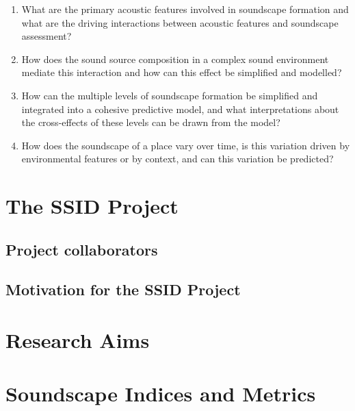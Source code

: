   \begin{enumerate}
    \item What are the primary acoustic features involved in soundscape formation and what are the driving interactions between acoustic features and soundscape assessment?
    \item How does the sound source composition in a complex sound environment mediate this interaction and how can this effect be simplified and modelled?
    \item How can the multiple levels of soundscape formation be simplified and integrated into a cohesive predictive model, and what interpretations about the cross-effects of these levels can be drawn from the model?
    \item How does the soundscape of a place vary over time, is this variation driven by environmental features or by context, and can this variation be predicted?
  \end{enumerate}

\section{The SSID Project}

  \subsection{Project collaborators}

  \subsection{Motivation for the SSID Project}

\section{Research Aims}

\section{Soundscape Indices and Metrics}

